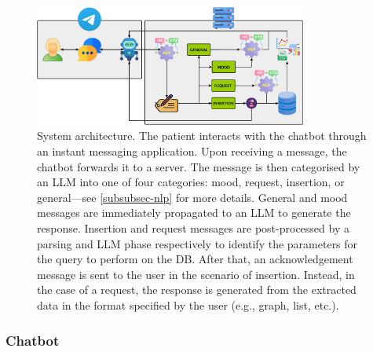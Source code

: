 \documentclass[preprint,12pt]{elsarticle}
\begin{document}
\begin{figure}[t]
	\centering
	\includegraphics[width=0.8\textwidth]{figures/system_scheme_3llm.pdf}
	\caption{
            System architecture.
            The patient interacts with the chatbot through an instant messaging application.
            Upon receiving a message, the chatbot forwards it to a server. 
            The message is then categorised by an LLM into one of four categories: mood, request, insertion, or general---see \ref{subsubsec-nlp} for more details. 
            General and mood messages are immediately propagated to an LLM to generate the response.
            Insertion and request messages are post-processed by a parsing and LLM phase respectively to identify the parameters for the query to perform on the DB.
            After that, an acknowledgement message is sent to the user in the scenario of insertion.
            Instead, in the case of a request, the response is generated from the extracted data in the format specified by the user (e.g., graph, list, etc.).
        }
	\label{fig:arch}
\end{figure}


\subsubsection{Chatbot}
\end{document}
